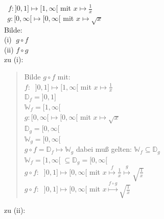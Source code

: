 \textbullet $\;\;f:]0,1]\longmapsto[1,\infty[$ mit $x\longmapsto \frac{1}{x}$\\

\textbullet $\;\,g:[0,\infty[ \longmapsto [0,\infty[$ mit $x\longmapsto\sqrt{x}$\vspace*{2mm}\\
Bilde:\\
(i) $\;g\circ f$\\
(ii) $f\circ g$\vspace*{2mm}\\
zu (i):\\
\begin{quote}
	Bilde $g\circ f$ mit:\\
	$f:\;\;]0,1] \longmapsto [1,\infty[$ mit $x\longmapsto\frac{1}{x}$\\
	$\mathbb{D}_f=]0,1]$\\
	$\mathbb{W}_f=[1,\infty[$\vspace*{2mm}\\
	$g:[0,\infty[ \longmapsto [0,\infty[$ mit $x\longmapsto\sqrt{x}$\\
	$\mathbb{D}_g=[0,\infty[$\\
	$\mathbb{W}_g=[0,\infty[$\vspace*{2mm}\\
	$g\circ f=\mathbb{D}_f\longmapsto\mathbb{W}_g$ dabei muß gelten: $\mathbb{W}_f\subseteq\mathbb{D}_g$\\
	$\mathbb{W}_f=[1,\infty[\;\subseteq\mathbb{D}_g=[0,\infty[$\vspace*{2mm}\\
	$g\circ f:\;\;]0,1]\longmapsto [0,\infty[$ mit $x\overset{f}{\longmapsto} \frac{1}{x}\overset{g}{\longmapsto}\sqrt{\scriptscriptstyle\frac{1}{x}}$\\
	$g\circ f:\;\;]0,1]\longmapsto [0,\infty[$ mit $x\overset{f\circ g}{\longmapsto} \sqrt{\scriptscriptstyle\frac{1}{x}}$\\ 
	
\end{quote}
\newpage
\noindent
zu (ii):\\
